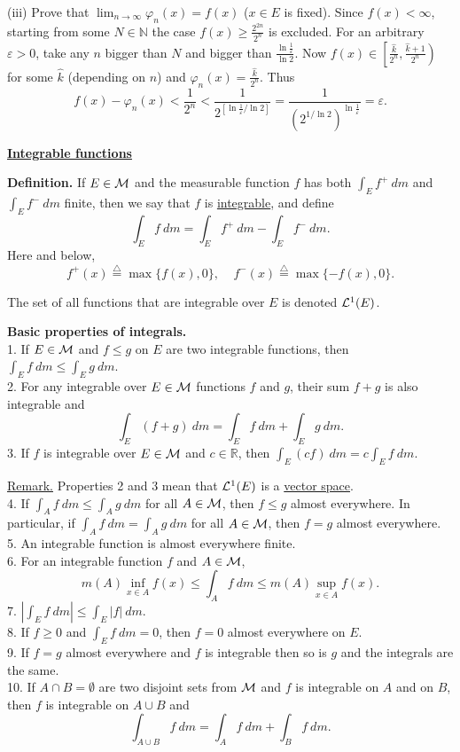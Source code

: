 \documentclass[a4paper,10pt]{article}
\def\NN{\mathbb{N}}
\def\RR{\mathbb{R}}
\newcommand{\1}[1]{\mathbf{1}_{\{#1\}}}
\newcommand{\defi}{\stackrel{\triangle}{=}}
\begin{document}
(iii) Prove that $\lim_{n\to\infty}\varphi_n(x)=f(x)$ ($x\in E$ is fixed). Since $f(x)<\infty$, starting from some $N\in\NN$ the case $f(x)\ge\frac{2^{2n}}{2^n}$ is excluded. For an arbitrary $\varepsilon>0$, take any $n$ bigger than $N$ and bigger than $\frac{\ln \frac{1}{\varepsilon}}{\ln 2}$. Now $f(x)\in\left[\frac{\hat k}{2^n},\frac{\hat k+1}{2^n}\right)$ for some $\hat k$ (depending on $n$) and $\varphi_n(x)=\frac{\hat k}{2^n}$. Thus
  $$f(x)-\varphi_n(x)<\frac{1}{2^n}<\frac{1}{2^{[\ln\frac{1}{\varepsilon}/\ln 2]}}
  =\frac{1}{\left(2^{1/\ln 2}\right)^{\ln\frac{1}{\varepsilon}}}=\varepsilon.$$
\blacksquare

\begin{center}\bf\underline{Integrable functions} \end{center}\vspace{5mm}

{\bf Definition.} If $E\in{\cal M}$ and the measurable function $f$ has both $\int_E f^+~dm$ and $\int_E f^-~dm$ finite, then we say that $f$ is \underline{integrable}, and define
  $$\int_E f~dm=\int_E f^+~dm-\int_E f^-~dm.$$
Here and below,
  $$f^+(x)\defi \max \{f(x),0\},~~~~~f^-(x)\defi \max \{-f(x),0\}.$$

The set of all functions that are integrable over $E$ is denoted ${\cal L}^1(E)$.
\vspace{10mm}

{\bf Basic properties of integrals.}\\
1. If $E\in{\cal M}$ and $f\le g$ on $E$ are two integrable functions, then $\displaystyle \int_E f~dm\le \int_E g~dm$.\\
2. For any integrable over $E\in{\cal M}$ functions $f$ and $g$, their sum $f+g$ is also integrable and
  $$\int_E(f+g)~dm=\int_E f~dm+\int_E g~dm.$$
3. If $f$ is integrable over $E\in{\cal M}$ and $c\in\RR$, then $\displaystyle\int_E(cf)~dm=c\int_E f~dm$.

\underline{Remark.} Properties 2 and 3 mean that ${\cal L}^1(E)$ is a \underline{vector space}.\\
4. If $\displaystyle\int_A f~dm\le \int_A g~dm$ for all $A\in{\cal M}$, then $f\le g$ almost everywhere. In particular, if $\displaystyle\int_A f~dm=\int_A g~dm$ for all $A\in{\cal M}$, then $f=g$ almost everywhere.\\
5. An integrable function is almost everywhere finite.\\
6. For an integrable function $f$ and $A\in{\cal M}$,
  $$m(A)\inf_{x\in A} f(x)\le\int_A f~dm\le m(A)\sup_{x\in A} f(x).$$
7. $\displaystyle\left|\int_E f~dm\right|\le \int_E |f|~dm$.\\
8. If $f\ge 0$ and $\displaystyle\int_E f~dm=0$, then $f=0$ almost everywhere on $E$.\\
9. If $f=g$ almost everywhere and $f$ is integrable then so is $g$ and the integrals are the same. \\
10. If $A\cap B=\emptyset$ are two disjoint sets from $\cal M$ and $f$ is integrable on $A$ and on $B$, then $f$ is integrable on $A\cup B$ and $$\int_{A\cup B} f~dm=\int_A f~dm+\int_B f~dm.$$
\vspace{5mm}
\end{document}
